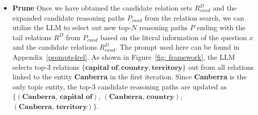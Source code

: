 \documentclass{article} %
\begin{document}
\begin{itemize}[leftmargin=*]
    \item \textbf{Prune} Once we have obtained the candidate relation sets $R^{D}_{cand}$ and the expanded candidate reasoning paths $P_{cand}$ from the relation search, we can utilize the LLM to select out new top-$N$ reasoning paths $P$ ending with the tail relations $R^{D}$ from $P_{cand}$ based on the literal information of the question $x$ and the candidate relations $R^{D}_{cand}$. The prompt used here can be found in Appendix~\ref{prompts4rel}. 
    As shown in Figure~\ref{fig: framework}, the LLM selects top-3 relations $\{\textbf{capital of}, \textbf{country}, \textbf{territory}\}$ out from all relations linked to the entity \textbf{Canberra} in the first iteration. Since \textbf{Canberra} is the only topic entity, the top-3 candidate reasoning paths are updated as $\{(\textbf{Canberra, capital of})$, $(\textbf{Canberra, country})$,$(\textbf{Canberra, territory})\}$.

        
\end{itemize}
\end{document}

